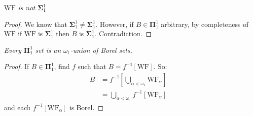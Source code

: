 \documentclass[]{article}
\newcommand{\om}{\omega}
\newcommand{\bosig}{\bm{\Sigma}}
\newcommand{\bopi}{\bm{\Pi}}
\newcommand{\wf}{\textrm{WF}}
\begin{document}
\begin{remark*}[Corollary]
    \emph{
        $\wf$ is not $\bosig^1_1$
    }
\end{remark*}
\begin{proof}
    We know that $\bosig^1_1 \ne \bosig^1_1$. However, if $B \in \bopi^1_1$ arbitrary, by completeness of $\wf$ if $\wf$ is $\bosig^1_1$ then $B$ is $\bosig^1_1$. Contradiction.
\end{proof}

\begin{remark*}[Corollary]
    \emph{
        Every $\bopi^1_1$ set is an $\om_1$-union of Borel sets.
    }
\end{remark*}
\begin{proof}
    If $B \in \bopi^1_1$, find $f$ such that $B = f^{-1}[\wf]$. So:
    \begin{align*}
        B &= f^{-1}\left[ \bigcup_{\alpha < \om_1}\wf_\alpha\right]\\
        &=\bigcup_{\alpha<\om_1}f^{-1}[\wf_\alpha]        
    \end{align*}
    and each $f^{-1}[\wf_\alpha]$ is Borel.
\end{proof}
\end{document}
